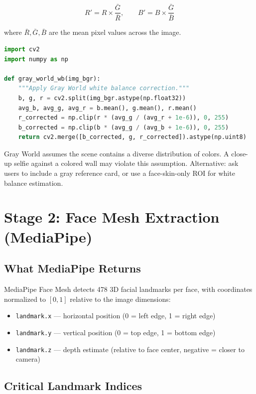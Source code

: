 \documentclass[12pt,a4paper]{article}
\begin{document}
\begin{equation}
R' = R \times \frac{\bar{G}}{\bar{R}}, \qquad B' = B \times \frac{\bar{G}}{\bar{B}}
\label{eq:grayworld}
\end{equation}

where $\bar{R}, \bar{G}, \bar{B}$ are the mean pixel values across the image.

\begin{lstlisting}[language=Python, caption={Gray World White Balance}]
import cv2
import numpy as np

def gray_world_wb(img_bgr):
    """Apply Gray World white balance correction."""
    b, g, r = cv2.split(img_bgr.astype(np.float32))
    avg_b, avg_g, avg_r = b.mean(), g.mean(), r.mean()
    r_corrected = np.clip(r * (avg_g / (avg_r + 1e-6)), 0, 255)
    b_corrected = np.clip(b * (avg_g / (avg_b + 1e-6)), 0, 255)
    return cv2.merge([b_corrected, g, r_corrected]).astype(np.uint8)
\end{lstlisting}

\begin{warnblock}[Limitation]
Gray World assumes the scene contains a diverse distribution of colors. A close-up selfie against a colored wall may violate this assumption. Alternative: ask users to include a gray reference card, or use a face-skin-only ROI for white balance estimation.
\end{warnblock}


\section{Stage 2: Face Mesh Extraction (MediaPipe)}

\subsection{What MediaPipe Returns}
MediaPipe Face Mesh detects 478 3D facial landmarks per face, with coordinates normalized to $[0, 1]$ relative to the image dimensions:
\begin{itemize}
    \item \texttt{landmark.x} --- horizontal position (0 = left edge, 1 = right edge)
    \item \texttt{landmark.y} --- vertical position (0 = top edge, 1 = bottom edge)
    \item \texttt{landmark.z} --- depth estimate (relative to face center, negative = closer to camera)
\end{itemize}

\subsection{Critical Landmark Indices}
\end{document}
